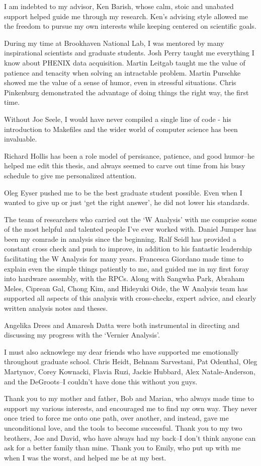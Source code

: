 I am indebted to my advisor, Ken Barish, whose calm, stoic and unabated support
helped guide me through my research. Ken's advising style allowed me the
freedom to pursue my own interests while keeping centered on scientific goals.

During my time at Brookhaven National Lab, I was mentored by many inspirational
scientists and graduate students. Josh Perry taught me everything I know about
PHENIX data acquisition. Martin Leitgab taught me the value of patience and
tenacity when solving an intractable problem. Martin Purschke showed me the
value of a sense of humor, even in stressful situations. Chris Pinkenburg
demonstrated the advantage of doing things the right way, the first time.

Without Joe Seele, I would have never compiled a single line of code - his
introduction to Makefiles and the wider world of computer science has been
invaluable. 

Richard Hollis has been a role model of persisance, patience, and good humor--he
helped me edit this thesis, and always seemed to carve out time from his
busy schedule to give me personalized attention.

Oleg Eyser pushed me to be the best graduate student possible. Even when I
wanted to give up or just `get the right answer', he did not lower his
standards.

The team of researchers who carried out the `W Analysis' with me comprise some
of the most helpful and talented people I've ever worked with. Daniel Jumper
has been my comrade in analysis since the beginning. Ralf Seidl has provided a
constant cross check and push to improve, in addition to his fantastic
leadership facilitating the W Analysis for many  years. Francesca Giordano made
time to explain even the simple things patiently to me, and guided me in my
first foray into hardware assembly, with the RPCs. Along with Sangwha Park,
Abraham Meles, Ciprean Gal, Chong Kim, and Hideyuki Oide, the W Analysis team
has supported all aspects of this analysis with cross-checks, expert advice,
and clearly written analysis notes and theses.

Angelika Drees and Amaresh Datta were both instrumental in directing and
discussing my progress with the `Vernier Analysis'.

I must also acknowlege my dear friends who have supported me emotionally
throughout graduate school. Chris Heidt, Behnam Sarvestani, Pat Odenthal, Oleg
Martynov, Corey Kownacki, Flavia Ruzi, Jackie Hubbard, Alex Natale-Anderson,
and the DeGroots--I couldn't have done this without you guys.

Thank you to my mother and father, Bob and Marian, who always made time to
support my various interests, and encouraged me to find my own way. They never
once tried to force me onto one path, over another, and instead, gave me
unconditional love, and the tools to become successful.  Thank you to my two
brothers, Joe and David, who have always had my back--I don't think anyone can
ask for a better family than mine.  Thank you to Emily, who put up with me when
I was the worst, and helped me be at my best.  
